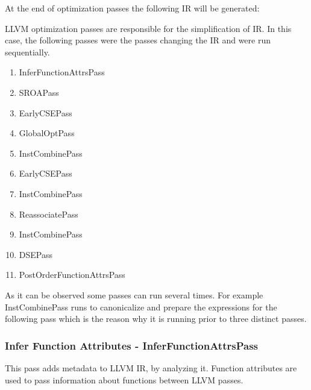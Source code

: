 \begin{minipage}{\linewidth}

\end{minipage}

At the end of optimization passes the following IR will be generated:
\begin{minipage}{\linewidth}

\end{minipage}
LLVM optimization passes are responsible for the simplification of IR. In this case, the following passes were the passes changing the IR and were run sequentially.
\begin{enumerate}
    \item InferFunctionAttrsPass 
    \item SROAPass 
    \item EarlyCSEPass 
    \item GlobalOptPass 
    \item InstCombinePass 
    \item EarlyCSEPass 
    \item InstCombinePass 
    \item ReassociatePass 
    \item InstCombinePass 
    \item DSEPass 
    \item PostOrderFunctionAttrsPass 
\end{enumerate}
 As it can be observed some passes can run several times. For example InstCombinePass runs to canonicalize and prepare the expressions for the following pass which is the reason why it is running prior to three distinct passes.


 \subsubsection{Infer Function Attributes - InferFunctionAttrsPass}\label{sec:funcAttrs}

 This pass adds metadata to LLVM IR, by analyzing it. Function attributes are used to pass information about functions between LLVM passes.

 
 

